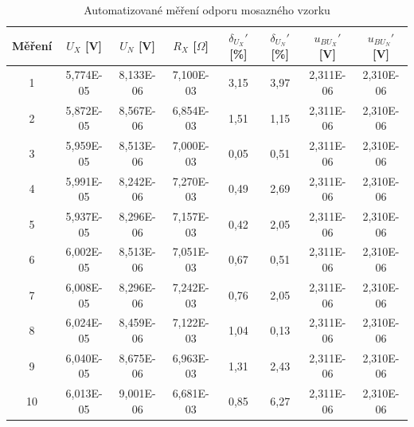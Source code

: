 \documentclass[a4paper, czech]{article}
\begin{document}
\begin{table}[H]
    \centering
    \caption{Automatizované měření odporu mosazného vzorku}
    \begin{tabular}{>{\columncolor{yellow!35}}c>{\columncolor{yellow!35}}c>{\columncolor{yellow!35}}c>{\columncolor{yellow!35}}ccccc}
        \hline
        \rowcolor{yellow} Měření & $U_X$ {[}V{]} & $U_N$ {[}V{]} & $R_X$ {[}$\Omega${]} & $\delta_{U_X}'$ {[}\%{]} & $\delta_{U_N}'$ {[}\%{]} & $u_{BU_X}'$ {[}V{]} & $u_{BU_N}'$ {[}V{]} \\
        \hline
        1  & 5,774E-05 & 8,133E-06 & 7,100E-03 & 3,15 & 3,97 & 2,311E-06 & 2,310E-06 \\
        2  & 5,872E-05 & 8,567E-06 & 6,854E-03 & 1,51 & 1,15 & 2,311E-06 & 2,310E-06 \\
        3  & 5,959E-05 & 8,513E-06 & 7,000E-03 & 0,05 & 0,51 & 2,311E-06 & 2,310E-06 \\
        4  & 5,991E-05 & 8,242E-06 & 7,270E-03 & 0,49 & 2,69 & 2,311E-06 & 2,310E-06 \\
        5  & 5,937E-05 & 8,296E-06 & 7,157E-03 & 0,42 & 2,05 & 2,311E-06 & 2,310E-06 \\
        6  & 6,002E-05 & 8,513E-06 & 7,051E-03 & 0,67 & 0,51 & 2,311E-06 & 2,310E-06 \\
        7  & 6,008E-05 & 8,296E-06 & 7,242E-03 & 0,76 & 2,05 & 2,311E-06 & 2,310E-06 \\
        8  & 6,024E-05 & 8,459E-06 & 7,122E-03 & 1,04 & 0,13 & 2,311E-06 & 2,310E-06 \\
        9  & 6,040E-05 & 8,675E-06 & 6,963E-03 & 1,31 & 2,43 & 2,311E-06 & 2,310E-06 \\
        10 & 6,013E-05 & 9,001E-06 & 6,681E-03 & 0,85 & 6,27 & 2,311E-06 & 2,310E-06 \\
        \hline
    \end{tabular}


\end{table}
\end{document}
